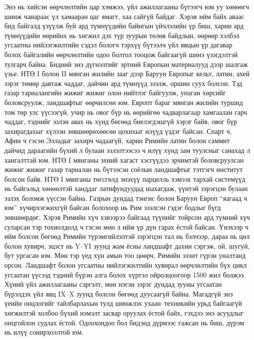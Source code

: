 Энэ нь хийсэн өөрчлөлтийн цар хэмжээ, үйл ажиллагааны бүтээгч юм уу хөнөөгч шинж чанараас үл хамааран цаг ямагт, хаа сайгүй байдаг. Хэрэв ийм байх аваас бид байгалд үзүүлж буй ард түмнүүдийн байнгын үйчлэлийн үр биш, харин ард түмнүүдийн өөрийнх нь хөгжил дэх түр зуурын төлөв байдлын, өөрөөр хэлбэл угсаатны нийлэгжилтийн сэдэл бологч тэрхүү бүтээлч үйл явцын үр дагавар болох байгалийн өөрчлөлтийн одоо болтол тооцож байгаагүй шинэ үзэгдэлтэй тулгарч байна.
Бидний энэ дүгнэлтийг эртний Европын материалууд дээр шалгаж үзье. НТӨ I болон II мянган жилийн зааг дээр Баруун Европыг кельт, латин, ахей зэрэг төмөр давтаж чаддаг, дайчин ард түмнүүд эзэлж, оршин суух болсон. Тэд газар тариалангийн жижиг жижиг олон нийтлэг байгуулж, унаган хөрсийг боловсруулж, ландшафтыг өөрчилсөн юм. Европт бараг мянган жилийн туршид том төр улс үүсээгүй, учир нь овог бүр нь өөрийгөө чадварлагаар хамгаалан гарч чаддаг, тэднийг эзлэн авах нь хүнд бөгөөд биелэгдэшгүй хэрэг байв, овог бүр захирагдахыг хүлээн зөвшөөрөхөөсөө цохихыг илүүд үздэг байсан. Спарт ч, Афин ч гэсэн Элладыг захирч чадаагүй, харин Римийн латин болон саммит дайчид дараагийн бүхий л булаан эзлэлтээсээ ч илүү хүнд зам туулсныг санахад л хангалттай юм. НТӨ I мянганы эхний хагаст хэсгүүдээ эрчимтэй боловсруулсан жижиг жижиг газар тариалан нь бүтээсэн соёлын ландшафтыг тэтгэгч институт болсон байв. НТӨ I мянганы төгсгөлд энэхүү парцелль хэмээх тархай системүүд нь байгальд хөнөөлтэй ханддаг латифундуудад шахагдаж, үүнтэй зэрэгцэн булаан эзлэх боломж үүссэн байна.
Газрын дундад тэнгис болон Баруун Европ “яагаад ч юм” хүчирхэгжихгүй байсан болохоор нь Рим эзэлсэн гэдэг бодлыг бүгд зөвшөөрдөг. Хэрэв Римийн хүч хэвээрээ байгаад түүнийг тойрсон ард түмний хүч суларсан тэр тохиолдолд ч гэсэн мөн л ийм үр дүн гарах ёстой байсан. Үнэхээр ч ийм болсон бөгөөд Римийн түрэмгийлэлтэй зэрэгцэн тал нь бэлчээр, дараа нь цөл болон хувирч, эцэст нь Y–YI зуунд жам ёсны ландшафт дахин сэргэж, ой, шугуй, бут ургасан юм. Мөн тэр үед хүн амын тоо цөөрч, Римийн эзэнт гүрэн уналтанд орсон. Ландшафт болон угсаатны нийлэгжилтийн хувирал өөрчлөлтийн бүх цикл угсаатан үүсээд тэдний бүрэн алга болох хүртэл ойролцоогоор 1500 жил болжээ.
Хүний үйл ажиллагааны сэргэлт, мөн нэгэн зэрэг дундад зууны угсаатан бүрэлдэх үйл явц IX–X зуунд болсон бөгөөд дуусаагүй байна. Магадгүй энэ үеийн онцлогийг тайлбарлахын тулд шинжлэх ухаан–техникийн урьд байгаагүй хөгжилтэй холбоо бүхий нэмэлт засвар оруулах ёстой байх, гэхдээ энэ асуудлыг онцгойлон судлах ёстой. Одоохондоо бол бидэнд дүрмээс гажсан нь биш, дүрэм нь илүү сонирхоллтой юм.

